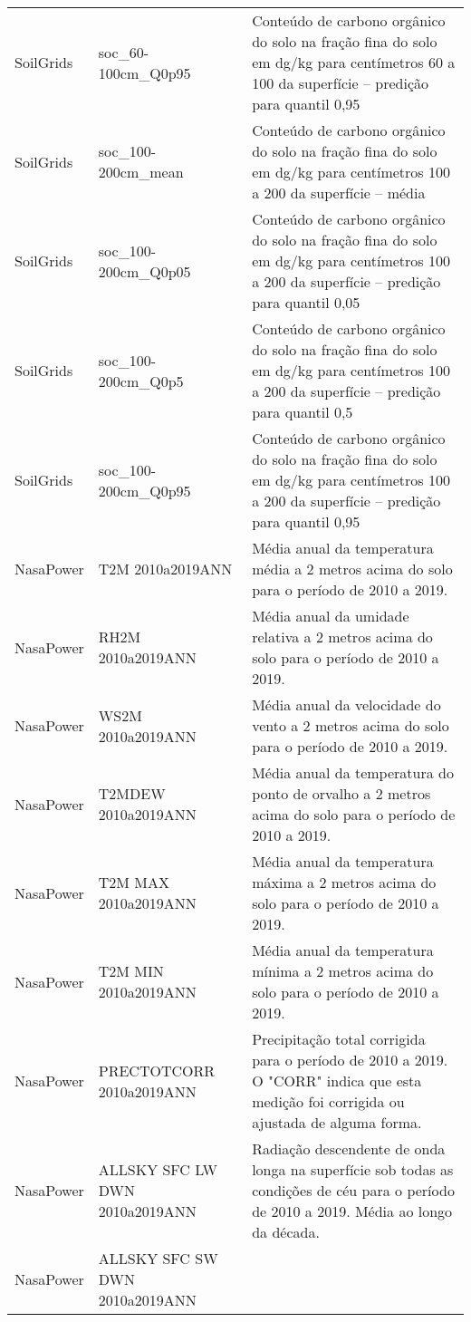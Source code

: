 \begin{longtable}{@{} p{4cm} p{4cm} p{8cm} @{}}
	SoilGrids &
	soc\_60-100cm\_Q0p95 &
	Conteúdo de carbono orgânico do solo na fração fina do solo em dg/kg para centímetros 60 a 100 da superfície – predição para quantil 0,95 \\
	SoilGrids &
	soc\_100-200cm\_mean &
	Conteúdo de carbono orgânico do solo na fração fina do solo em dg/kg para centímetros 100 a 200 da superfície – média \\
	SoilGrids &
	soc\_100-200cm\_Q0p05 &
	Conteúdo de carbono orgânico do solo na fração fina do solo em dg/kg para centímetros 100 a 200 da superfície – predição para quantil 0,05 \\
	SoilGrids &
	soc\_100-200cm\_Q0p5 &
	Conteúdo de carbono orgânico do solo na fração fina do solo em dg/kg para centímetros 100 a 200 da superfície – predição para quantil 0,5 \\
	SoilGrids &
	soc\_100-200cm\_Q0p95 &
	Conteúdo de carbono orgânico do solo na fração fina do solo em dg/kg para centímetros 100 a 200 da superfície – predição para quantil 0,95 \\
	NasaPower &
	T2M 2010a2019ANN &
	Média anual da temperatura média a 2 metros acima do solo para o período de 2010 a 2019. \\
	NasaPower &
	RH2M 2010a2019ANN &
	Média anual da umidade relativa a 2 metros acima do solo para o período de 2010 a 2019. \\
	NasaPower &
	WS2M 2010a2019ANN &
	Média anual da velocidade do vento a 2 metros acima do solo para o período de 2010 a 2019. \\
	NasaPower &
	T2MDEW 2010a2019ANN &
	Média anual da temperatura do ponto de orvalho a 2 metros acima do solo para o período de 2010 a 2019. \\
	NasaPower &
	T2M MAX 2010a2019ANN &
	Média anual da temperatura máxima a 2 metros acima do solo para o período de 2010 a 2019. \\
	NasaPower &
	T2M MIN 2010a2019ANN &
	Média anual da temperatura mínima a 2 metros acima do solo para o período de 2010 a 2019. \\
	NasaPower &
	PRECTOTCORR 2010a2019ANN &
	Precipitação total corrigida para o período de 2010 a 2019. O "CORR" indica que esta medição foi corrigida ou ajustada de alguma forma. \\
	NasaPower &
	ALLSKY SFC LW DWN 2010a2019ANN &
	Radiação descendente de onda longa na superfície sob todas as condições de céu para o período de 2010 a 2019. Média ao longo da década. \\
	NasaPower &
	ALLSKY SFC SW DWN 2010a2019ANN &

\end{longtable}
